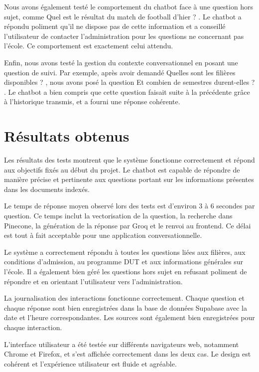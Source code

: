 \documentclass[12pt, a4paper, twoside]{report}
\begin{document}
Nous avons également testé le comportement du chatbot face à une question hors sujet, comme \og Quel est le résultat du match de football d'hier ? \fg. Le chatbot a répondu poliment qu'il ne dispose pas de cette information et a conseillé l'utilisateur de contacter l'administration pour les questions ne concernant pas l'école. Ce comportement est exactement celui attendu.

Enfin, nous avons testé la gestion du contexte conversationnel en posant une question de suivi. Par exemple, après avoir demandé \og Quelles sont les filières disponibles ? \fg, nous avons posé la question \og Et combien de semestres durent-elles ? \fg. Le chatbot a bien compris que cette question faisait suite à la précédente grâce à l'historique transmis, et a fourni une réponse cohérente.

\section{Résultats obtenus}
Les résultats des tests montrent que le système fonctionne correctement et répond aux objectifs fixés au début du projet. Le chatbot est capable de répondre de manière précise et pertinente aux questions portant sur les informations présentes dans les documents indexés.

Le temps de réponse moyen observé lors des tests est d'environ 3 à 6 secondes par question. Ce temps inclut la vectorisation de la question, la recherche dans Pinecone, la génération de la réponse par Groq et le renvoi au frontend. Ce délai est tout à fait acceptable pour une application conversationnelle.

Le système a correctement répondu à toutes les questions liées aux filières, aux conditions d'admission, au programme DUT et aux informations générales sur l'école. Il a également bien géré les questions hors sujet en refusant poliment de répondre et en orientant l'utilisateur vers l'administration.

La journalisation des interactions fonctionne correctement. Chaque question et chaque réponse sont bien enregistrées dans la base de données Supabase avec la date et l'heure correspondantes. Les sources sont également bien enregistrées pour chaque interaction.

L'interface utilisateur a été testée sur différents navigateurs web, notamment Chrome et Firefox, et s'est affichée correctement dans les deux cas. Le design est cohérent et l'expérience utilisateur est fluide et agréable.
\end{document}

